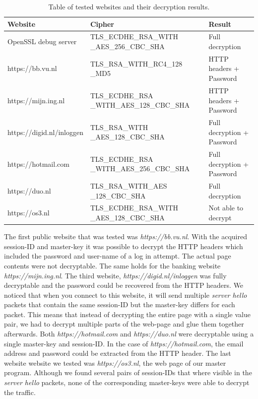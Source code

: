 \documentclass[12pt, a4paper]{report}
\begin{document}
\begin{table}[h]
\begin{tabular}{ |l|p{5cm}|p{5cm}| } 
 \hline
 Website & Cipher & Result \\ \hline 
 OpenSSL debug server & TLS\_ECDHE\_RSA\_WITH \_AES\_256\_CBC\_SHA & Full decryption \\ \hline
 
 https://bb.vu.nl & TLS\_RSA\_WITH\_RC4\_128 \_MD5 & HTTP headers + Password \\ \hline
 
 https://mijn.ing.nl & TLS\_ECDHE\_RSA \_WITH\_AES\_128\_CBC\_SHA & HTTP headers + Password \\ \hline

 https://digid.nl/inloggen & TLS\_RSA\_WITH \_AES\_128\_CBC\_SHA & Full decryption + Password \\ \hline

 https://hotmail.com & TLS\_ECDHE\_RSA \_WITH\_AES\_256\_CBC\_SHA & Full decryption + Password \\ \hline

 https://duo.nl & TLS\_RSA\_WITH\_AES \_128\_CBC\_SHA & Full decryption \\ \hline
 
 https://os3.nl & TLS\_ECDHE\_RSA\_WITH \_AES\_128\_CBC\_SHA & Not able to decrypt \\ \hline

\end{tabular}

\caption{Table of tested websites and their decryption results.}
\end{table}


The first public website that was tested was \textit{https://bb.vu.nl}. With the acquired session-ID and master-key it was possible to decrypt the HTTP headers which included the password and user-name of a log in attempt. The actual page contents were not decryptable. The same holds for the banking website \textit{ https://mijn.ing.nl}.
\newline
\newline
The third website, \textit{https://digid.nl/inloggen} was fully decryptable and the password could be recovered from the HTTP headers. We noticed that when you connect to this website, it will send multiple \textit{server hello} packets that contain the same session-ID but the master-key differs for each packet. This means that instead of decrypting the entire page with a single value pair, we had to decrypt multiple parts of the web-page and glue them together afterwards.
\newline
\newline
Both \textit{https://hotmail.com} and \textit{https://duo.nl} were decryptable using a single master-key and session-ID. In the case of \textit{https://hotmail.com}, the email address and password could be extracted from the HTTP header. 
\newline
\newline
The last website website we tested was \textit{https://os3.nl}, the web page of our master program. Although we found several pairs of session-IDs that where visible in the \textit{server hello} packets, none of the corresponding master-keys were able to decrypt the traffic.
\end{document}
